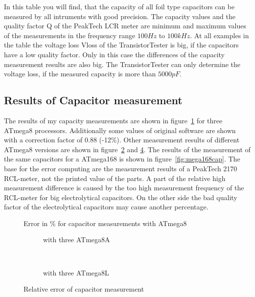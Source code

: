 In this table you will find, that the capacity of all foil type capacitors can be measured by all intruments
with good precision.
The capacity values and the quality factor Q of the PeakTech LCR meter are minimum and maximum values of the
measurements in the frequency range \(100 Hz\) to \(100 kHz\).
At all examples in the table the voltage loss Vloss of the TransistorTester is big,
if the capacitors have a low quality factor.
Only in this case the differences of the capacity measurement results are also big.
The TransistorTester can only determine the voltage loss, if the measured capacity is more than \(5000 pF\).




\subsection{Results of Capacitor measurement}
The results of my capacity measurements are shown in figure~\ref{fig:mega8cap} for three ATmega8 processors.
Additionally some values of original software are shown with a correction factor of 0.88 (-12\%).
Other measurement results of different ATmega8 versions are shown in figure~\ref{fig:mega8Acap} and \ref{fig:mega8Lcap}.
The results of the measurement of the same capacitors for a ATmega168 is shown in figure~\ref{fig:mega168cap}.
The base for the error computing are the measurement results of a PeakTech 2170 RCL-meter, not the printed value
of the parts.
A part of the relative high measurement difference is caused by the too high measurement frequency of the RCL-meter for big
electrolytical capacitors. On the other side the bad quality factor of the electrolytical capacitors may cause
another percentage.

\begin{figure}[H]
\centering

\caption{Error in \% for capacitor measurements with ATmega8 }
\label{fig:mega8cap}
\end{figure}

\begin{figure}[H]
  \begin{subfigure}[b]{9cm}
    \centering
    \resizebox{9cm}{!}{}
    \caption{with three ATmega8A}
    \label{fig:mega8Acap}
  \end{subfigure}
  ~
  \begin{subfigure}[b]{9cm}
    \centering
    \resizebox{9cm}{!}{}
    \caption{with three ATmega8L}
    \label{fig:mega8Lcap}
  \end{subfigure}
  \caption{Relative error of capacitor measurement}
\end{figure}

